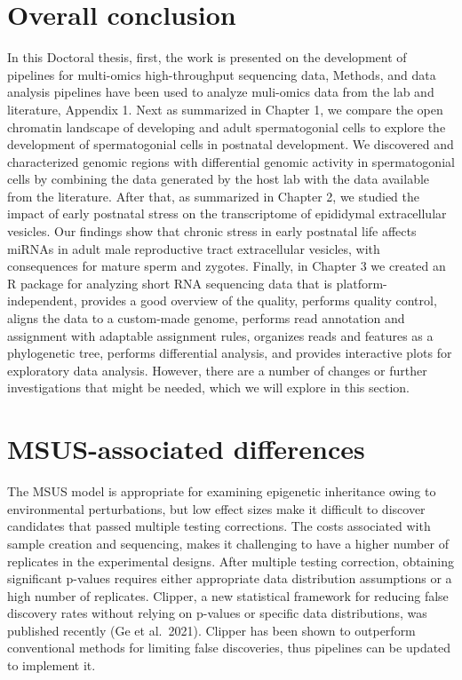 \documentclass[12pt,twoside]{reedthesis}
\begin{document}
\hypertarget{overall-conclusion}{%
\section{Overall conclusion}\label{overall-conclusion}}

In this Doctoral thesis, first, the work is presented on the development of pipelines for multi-omics high-throughput sequencing data, Methods, and data analysis pipelines have been used to analyze muli-omics data from the lab and literature, Appendix 1. Next as summarized in Chapter 1, we compare the open chromatin landscape of developing and adult spermatogonial cells to explore the development of spermatogonial cells in postnatal development. We discovered and characterized genomic regions with differential genomic activity in spermatogonial cells by combining the data generated by the host lab with the data available from the literature. After that, as summarized in Chapter 2, we studied the impact of early postnatal stress on the transcriptome of epididymal extracellular vesicles. Our findings show that chronic stress in early postnatal life affects miRNAs in adult male reproductive tract extracellular vesicles, with consequences for mature sperm and zygotes. Finally, in Chapter 3 we created an R package for analyzing short RNA sequencing data that is platform-independent, provides a good overview of the quality, performs quality control, aligns the data to a custom-made genome, performs read annotation and assignment with adaptable assignment rules, organizes reads and features as a phylogenetic tree, performs differential analysis, and provides interactive plots for exploratory data analysis. However, there are a number of changes or further investigations that might be needed, which we will explore in this section.

\hypertarget{msus-associated-differences}{%
\section*{MSUS-associated differences}\label{msus-associated-differences}}

The MSUS model is appropriate for examining epigenetic inheritance owing to environmental perturbations, but low effect sizes make it difficult to discover candidates that passed multiple testing corrections. The costs associated with sample creation and sequencing, makes it challenging to have a higher number of replicates in the experimental designs. After multiple testing correction, obtaining significant p-values requires either appropriate data distribution assumptions or a high number of replicates. Clipper, a new statistical framework for reducing false discovery rates without relying on p-values or specific data distributions, was published recently (Ge et al.~2021). Clipper has been shown to outperform conventional methods for limiting false discoveries, thus pipelines can be updated to implement it.
\end{document}
